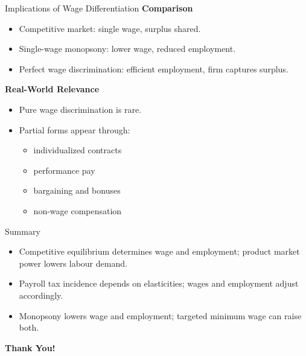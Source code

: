 \documentclass[aspectratio=169]{beamer}
\begin{document}
\begin{frame}{Implications of Wage Differentiation}
\textbf{Comparison}
\begin{itemize}
\item Competitive market: single wage, surplus shared.
\item Single-wage monopsony: lower wage, reduced employment.
\item Perfect wage discrimination: efficient employment, firm captures surplus.
\end{itemize}

\textbf{Real-World Relevance}
\begin{itemize}
\item Pure wage discrimination is rare.
\item Partial forms appear through:
\begin{itemize}
\item individualized contracts
\item performance pay
\item bargaining and bonuses
\item non-wage compensation
\end{itemize}
\end{itemize}

\end{frame}









\begin{frame}{Summary}
\transfade
\begin{itemize}
  \item Competitive equilibrium determines wage and employment; product market power lowers labour demand.
  \item Payroll tax incidence depends on elasticities; wages and employment adjust accordingly.
  \item Monopsony lowers wage and employment; targeted minimum wage can raise both.

\end{itemize}
\end{frame}

\begin{frame}
\centering
\Huge{\textbf{Thank You!}} \\

\end{frame}
\end{document}
